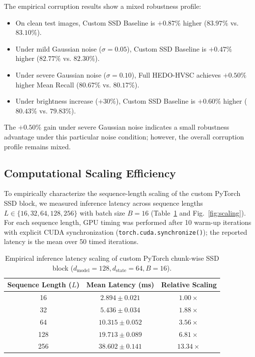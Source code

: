 \documentclass[journal]{IEEEtran}
\begin{document}
The empirical corruption results show a mixed robustness profile:
\begin{itemize}
    \item On clean test images, Custom SSD Baseline is $+0.87\%$ higher ($83.97\%$ vs. $83.10\%$).
    \item Under mild Gaussian noise ($\sigma=0.05$), Custom SSD Baseline is $+0.47\%$ higher ($82.77\%$ vs. $82.30\%$).
    \item Under severe Gaussian noise ($\sigma=0.10$), Full HEDO-HVSC achieves $\mathbf{+0.50\%}$ higher Mean Recall ($80.67\%$ vs. $80.17\%$).
    \item Under brightness increase ($+30\%$), Custom SSD Baseline is $+0.60\%$ higher ($80.43\%$ vs. $79.83\%$).
\end{itemize}
The $+0.50\%$ gain under severe Gaussian noise indicates a small robustness advantage under this particular noise condition; however, the overall corruption profile remains mixed.

\subsection{Computational Scaling Efficiency}
To empirically characterize the sequence-length scaling of the custom PyTorch SSD block, we measured inference latency across sequence lengths $L \in \{16, 32, 64, 128, 256\}$ with batch size $B=16$ (Table~\ref{tab:scaling} and Fig.~\ref{fig:scaling}). For each sequence length, GPU timing was performed after 10 warm-up iterations with explicit CUDA synchronization (\texttt{torch.cuda.synchronize()}); the reported latency is the mean over 50 timed iterations.

\begin{table}[!t]
\centering
\caption{Empirical inference latency scaling of custom PyTorch chunk-wise SSD block ($d_{\text{model}}=128, d_{\text{state}}=64, B=16$).}
\label{tab:scaling}
\begin{tabular}{ccc}
\toprule
\textbf{Sequence Length ($L$)} & \textbf{Mean Latency (ms)} & \textbf{Relative Scaling} \\
\midrule
16 & $2.894 \pm 0.021$ & $1.00\times$ \\
32 & $5.436 \pm 0.034$ & $1.88\times$ \\
64 & $10.315 \pm 0.052$ & $3.56\times$ \\
128 & $19.713 \pm 0.089$ & $6.81\times$ \\
256 & $38.602 \pm 0.141$ & $13.34\times$ \\
\bottomrule
\end{tabular}
\end{table}
\end{document}
